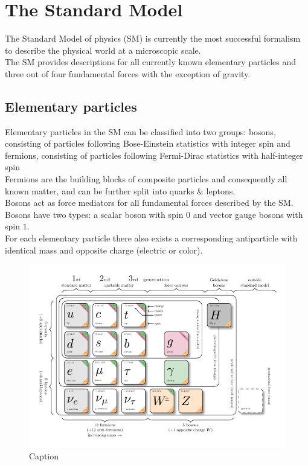 \documentclass[../thesis.tex]{subfiles}
\begin{document}
\vspace{-1\baselineskip}

\section{The Standard Model}
\label{sec:SM}
The Standard Model of physics (\acs{SM}) is currently the most successful formalism to describe the physical world at a microscopic scale.\\
The \acs{SM} provides descriptions for all currently known elementary particles and three out of four fundamental forces with the exception of gravity.\\
\subsection{Elementary particles}
Elementary particles in the \acs{SM} can be classified into two groups: bosons, consisting of particles following Bose-Einstein statistics with integer spin and fermions, consisting of particles following Fermi-Dirac statistics with half-integer spin\\
Fermions are the building blocks of composite particles and consequently all known matter, and can be further split into quarks \& leptons.\\
Bosons act as force mediators for all fundamental forces described by the \acs{SM}. Bosons have two types: a scalar boson with spin $0$ and vector gauge bosons with spin $1$.\\
For each elementary particle there also exists a corresponding antiparticle with identical mass and opposite charge (electric or color).

\begin{figure}[!htbp]
\begin{center}
\includegraphics[width=\linewidth]{fig/theory_smparticles.pdf}
\caption[Caption]{\label{fig:smparticles}Caption\citep{theory:smparticles}}
\end{center}
\end{figure}
\end{document}
